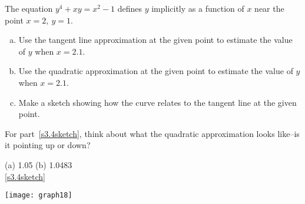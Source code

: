 \begin{Mquestion}[1997A]
 The equation $y^4+xy=x^2-1$ defines $y$ implicitly as a function
of $x$ near the point $x=2,\ y=1$.
\begin{enumerate}[(a)]
\item Use the tangent line approximation at the given point to
estimate the value of $y$ when $x=2.1$.
\item Use the quadratic approximation at the given point to
estimate the value of $y$ when $x=2.1$.
\item\label{s3.4sketch} Make a sketch showing how the curve relates to the tangent
line at the given point.
\end{enumerate}
\end{Mquestion}
\begin{hint}
For part~\eqref{s3.4sketch}, think about what the quadratic approximation looks like--is it pointing up or down?
\end{hint}
\begin{answer}
(a) 1.05\qquad
(b) 1.0483\\
\eqref{s3.4sketch} \begin{center}
\texttt{[image: graph18]}
\end{center}
\end{answer}
